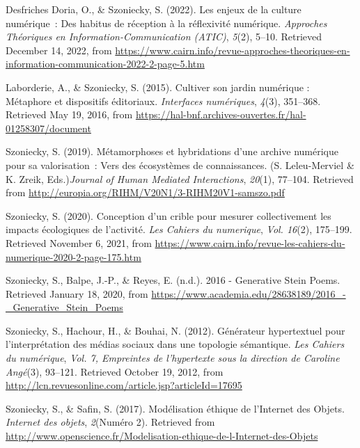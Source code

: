 \documentclass[
  a4paper,
  DIV=11,
  numbers=noendperiod]{scrreprt}
\newlength{\cslhangindent}
\newenvironment{CSLReferences}[2] %
 {\begin{list}{}{%
  \setlength{\itemindent}{0pt}
  \setlength{\leftmargin}{0pt}
  \setlength{\parsep}{0pt}
  \ifodd #1
   \setlength{\leftmargin}{\cslhangindent}
   \setlength{\itemindent}{-1\cslhangindent}
  \fi
  \setlength{\itemsep}{#2\baselineskip}}}
 {\end{list}}
\begin{document}
\label{refs-articleRevue}
\begin{CSLReferences}{1}{0}
Desfriches Doria, O., \& Szoniecky, S. (2022). Les enjeux de la culture
numérique~: Des habitus de réception à la réflexivité numérique.
\emph{Approches Théoriques en Information-Communication (ATIC)},
\emph{5}(2), 5--10. Retrieved December 14, 2022, from
\url{https://www.cairn.info/revue-approches-theoriques-en-information-communication-2022-2-page-5.htm}

Laborderie, A., \& Szoniecky, S. (2015). Cultiver son jardin numérique :
Métaphore et dispositifs éditoriaux. \emph{Interfaces numériques},
\emph{4}(3), 351--368. Retrieved May 19, 2016, from
\url{https://hal-bnf.archives-ouvertes.fr/hal-01258307/document}

Szoniecky, S. (2019). Métamorphoses et hybridations d'une archive
numérique pour sa valorisation~: Vers des écosystèmes de connaissances.
(S. Leleu-Merviel \& K. Zreik, Eds.)\emph{Journal of Human Mediated
Interactions}, \emph{20}(1), 77--104. Retrieved from
\url{http://europia.org/RIHM/V20N1/3-RIHM20V1-samszo.pdf}

Szoniecky, S. (2020). Conception d'un crible pour mesurer collectivement
les impacts écologiques de l'activité. \emph{Les Cahiers du numerique},
\emph{Vol. 16}(2), 175--199. Retrieved November 6, 2021, from
\url{https://www.cairn.info/revue-les-cahiers-du-numerique-2020-2-page-175.htm}

Szoniecky, S., Balpe, J.-P., \& Reyes, E. (n.d.). 2016 - {Generative}
{Stein} {Poems}. Retrieved January 18, 2020, from
\url{https://www.academia.edu/28638189/2016_-_Generative_Stein_Poems}

Szoniecky, S., Hachour, H., \& Bouhai, N. (2012). Générateur
hypertextuel pour l'interprétation des médias sociaux dans une topologie
sémantique. \emph{Les Cahiers du numérique}, \emph{Vol. 7, Empreintes de
l'hypertexte sous la direction de Caroline Angé}(3), 93--121. Retrieved
October 19, 2012, from
\url{http://lcn.revuesonline.com/article.jsp?articleId=17695}

Szoniecky, S., \& Safin, S. (2017). Modélisation éthique de l'{Internet}
des {Objets}. \emph{Internet des objets}, \emph{2}(Numéro 2). Retrieved
from
\url{http://www.openscience.fr/Modelisation-ethique-de-l-Internet-des-Objets}


\end{CSLReferences}
\end{document}
